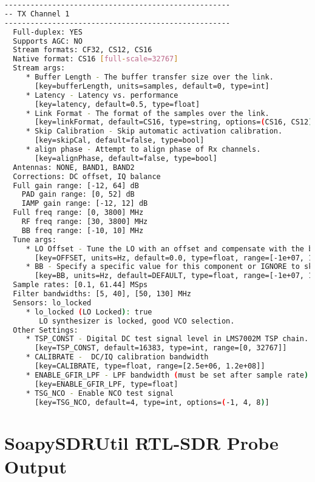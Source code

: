 \begin{appendices}
\begin{lstlisting}[language=bash, caption={SoapySDRUtil Probe Output for LimeSDR}, label={lst: soapyProbe}]
----------------------------------------------------
-- TX Channel 1
----------------------------------------------------
  Full-duplex: YES
  Supports AGC: NO
  Stream formats: CF32, CS12, CS16
  Native format: CS16 [full-scale=32767]
  Stream args:
     * Buffer Length - The buffer transfer size over the link.
       [key=bufferLength, units=samples, default=0, type=int]
     * Latency - Latency vs. performance
       [key=latency, default=0.5, type=float]
     * Link Format - The format of the samples over the link.
       [key=linkFormat, default=CS16, type=string, options=(CS16, CS12)]
     * Skip Calibration - Skip automatic activation calibration.
       [key=skipCal, default=false, type=bool]
     * align phase - Attempt to align phase of Rx channels.
       [key=alignPhase, default=false, type=bool]
  Antennas: NONE, BAND1, BAND2
  Corrections: DC offset, IQ balance
  Full gain range: [-12, 64] dB
    PAD gain range: [0, 52] dB
    IAMP gain range: [-12, 12] dB
  Full freq range: [0, 3800] MHz
    RF freq range: [30, 3800] MHz
    BB freq range: [-10, 10] MHz
  Tune args:
     * LO Offset - Tune the LO with an offset and compensate with the baseband CORDIC.
       [key=OFFSET, units=Hz, default=0.0, type=float, range=[-1e+07, 1e+07]]
     * BB - Specify a specific value for this component or IGNORE to skip tuning it.
       [key=BB, units=Hz, default=DEFAULT, type=float, range=[-1e+07, 1e+07], options=(DEFAULT, IGNORE)]
  Sample rates: [0.1, 61.44] MSps
  Filter bandwidths: [5, 40], [50, 130] MHz
  Sensors: lo_locked
     * lo_locked (LO Locked): true
        LO synthesizer is locked, good VCO selection.
  Other Settings:
     * TSP_CONST - Digital DC test signal level in LMS7002M TSP chain.
       [key=TSP_CONST, default=16383, type=int, range=[0, 32767]]
     * CALIBRATE -  DC/IQ calibration bandwidth
       [key=CALIBRATE, type=float, range=[2.5e+06, 1.2e+08]]
     * ENABLE_GFIR_LPF - LPF bandwidth (must be set after sample rate)
       [key=ENABLE_GFIR_LPF, type=float]
     * TSG_NCO - Enable NCO test signal
       [key=TSG_NCO, default=4, type=int, options=(-1, 4, 8)]


\end{lstlisting}

\section{SoapySDRUtil RTL-SDR Probe Output}
\begin{lstlisting}[language=bash, caption={SoapySDRUtil Probe Output for RTL-SDR}, label={lst: soapyProbeRTL}]


\end{lstlisting}
\end{appendices}
